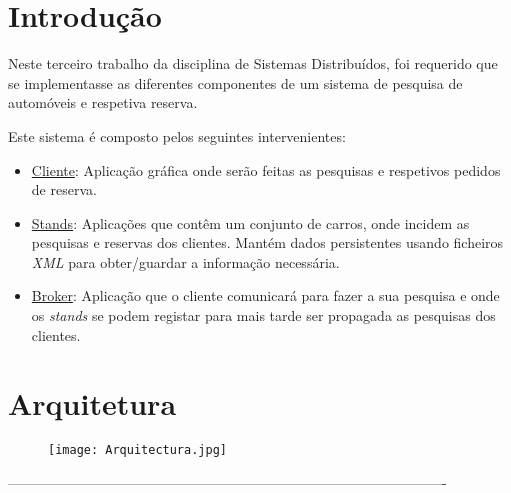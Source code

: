 \documentclass[a4paper]{article}
\begin{document}
\newpage
\thispagestyle{empty} %

\tableofcontents

\newpage
\setcounter{page}{1} %

\section{Introdução}

Neste terceiro trabalho da disciplina de Sistemas Distribuídos, foi requerido que se implementasse as diferentes componentes de um sistema de pesquisa de automóveis e respetiva reserva.

Este sistema é composto pelos seguintes intervenientes:

\begin{itemize}

\item
\underline{Cliente}: Aplicação gráfica onde serão feitas as pesquisas e respetivos pedidos de reserva.

\item
\underline{Stands}: Aplicações que contêm um conjunto de carros, onde incidem as pesquisas e reservas dos clientes. Mantém dados persistentes usando ficheiros \emph{XML} para obter/guardar a informação necessária. 

\item
\underline{Broker}: Aplicação que o cliente comunicará para fazer a sua pesquisa e onde os \emph{stands} se podem registar para mais tarde ser propagada as pesquisas dos clientes.

\end{itemize}

\newpage

\section{Arquitetura}

\begin{figure}[H]
\centering
\texttt{[image: Arquitectura.jpg]}\\
\end{figure}

----------------------------------------------------------------------------------------------
\end{document}
